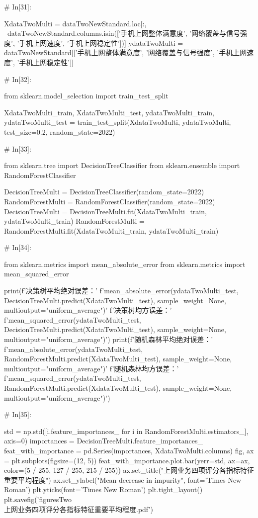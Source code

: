 \documentclass{MathorCupmodeling}
\begin{document}
\begin{python}
	# In[31]:
	
	
	XdataTwoMulti = dataTwoNewStandard.loc[:, ~dataTwoNewStandard.columns.isin(['手机上网整体满意度', '网络覆盖与信号强度', '手机上网速度', '手机上网稳定性'])]
	ydataTwoMulti = dataTwoNewStandard[['手机上网整体满意度', '网络覆盖与信号强度', '手机上网速度', '手机上网稳定性']]
	
	# In[32]:
	
	
	from sklearn.model_selection import train_test_split
	
	XdataTwoMulti_train, XdataTwoMulti_test, ydataTwoMulti_train, ydataTwoMulti_test = train_test_split(XdataTwoMulti, ydataTwoMulti, test_size=0.2, random_state=2022)
	
	# In[33]:
	
	
	from sklearn.tree import DecisionTreeClassifier
	from sklearn.ensemble import RandomForestClassifier
	
	DecisionTreeMulti = DecisionTreeClassifier(random_state=2022)
	RandomForestMulti = RandomForestClassifier(random_state=2022)
	DecisionTreeMulti = DecisionTreeMulti.fit(XdataTwoMulti_train, ydataTwoMulti_train)
	RandomForestMulti = RandomForestMulti.fit(XdataTwoMulti_train, ydataTwoMulti_train)
	
	# In[34]:
	
	
	from sklearn.metrics import mean_absolute_error
	from sklearn.metrics import mean_squared_error
	
	print(f'决策树平均绝对误差：'
		  f'{mean_absolute_error(ydataTwoMulti_test, DecisionTreeMulti.predict(XdataTwoMulti_test), sample_weight=None, multioutput="uniform_average")}\n'
		  f'决策树均方误差：'
		  f'{mean_squared_error(ydataTwoMulti_test, DecisionTreeMulti.predict(XdataTwoMulti_test), sample_weight=None, multioutput="uniform_average")}')
	print(f'随机森林平均绝对误差：'
		  f'{mean_absolute_error(ydataTwoMulti_test, RandomForestMulti.predict(XdataTwoMulti_test), sample_weight=None, multioutput="uniform_average")}\n'
		  f'随机森林均方误差：'
		  f'{mean_squared_error(ydataTwoMulti_test, RandomForestMulti.predict(XdataTwoMulti_test), sample_weight=None, multioutput="uniform_average")}')
	
	# In[35]:
	
	
	std = np.std([i.feature_importances_ for i in RandomForestMulti.estimators_], axis=0)
	importances = DecisionTreeMulti.feature_importances_
	feat_with_importance = pd.Series(importances, XdataTwoMulti.columns)
	fig, ax = plt.subplots(figsize=(12, 5))
	feat_with_importance.plot.bar(yerr=std, ax=ax, color=(5 / 255, 127 / 255, 215 / 255))
	ax.set_title("上网业务四项评分各指标特征重要平均程度")
	ax.set_ylabel("Mean decrease in impurity", font='Times New Roman')
	plt.yticks(font='Times New Roman')
	plt.tight_layout()
	plt.savefig('figuresTwo\\[附件2]上网业务四项评分各指标特征重要平均程度.pdf')
	

\end{python}
\end{document}
